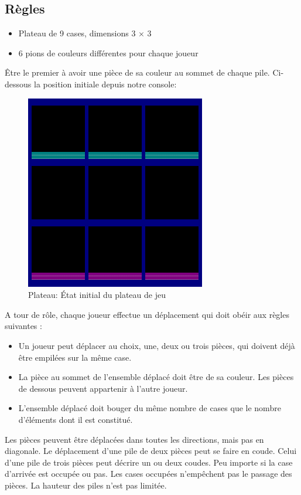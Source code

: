 \documentclass[article, backcover, french, nodocumentinfo]{upmethodology-document}
\begin{document}
		\subsection{Règles}
				\begin{itemize}
					\item Plateau de 9 cases, dimensions 3 $\times$ 3
					\item 6 pions de couleurs différentes pour chaque joueur
				\end{itemize}
				Être le premier à avoir une pièce de sa couleur au sommet de chaque pile.
				Ci-dessous la position initiale depuis notre console:
				\begin{figure}[h!]
					\centering
					\includegraphics[width=0.7\textwidth]{figures/ConsoleUI}
					\caption{Plateau: État initial du plateau de jeu}
				\end{figure}
				A tour de rôle, chaque joueur effectue un déplacement qui doit obéir aux règles suivantes :
				\begin{itemize}
					\item Un joueur peut déplacer au choix, une, deux ou trois pièces, qui doivent déjà être empilées sur la même case.
					\item La pièce au sommet de l’ensemble déplacé doit être de sa couleur. Les pièces de dessous peuvent appartenir à l’autre joueur.
					\item L’ensemble déplacé doit bouger du même nombre de cases que le nombre d’éléments dont il est constitué.
				\end{itemize}
				Les pièces peuvent être déplacées dans toutes les directions, mais pas en diagonale. Le déplacement d’une pile de deux pièces peut se faire en coude. Celui d’une pile de trois pièces peut décrire un ou deux coudes. Peu importe si la case d’arrivée est occupée ou pas. Les cases occupées n’empêchent pas le passage des pièces. La hauteur des piles n’est pas limitée.
\end{document}
